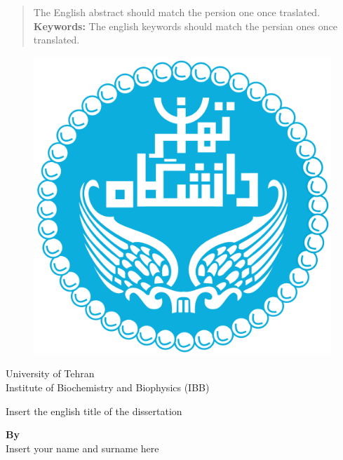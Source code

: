 \documentclass[12pt]{report}
\begin{document}
\begin{latin}
\begin{abstract}
The English abstract should match the persion one once traslated.\\[0.5cm]
\textbf{Keywords: } The english keywords should match the persian ones once translated. 
\end{abstract}
\newpage

\begin{figure}
\centering
\includegraphics[scale=0.1]{UT-Logo.png}
\end{figure}
\begin{center}
University of Tehran\\
Institute of Biochemistry and Biophysics (IBB)
\end{center}

\vfill

\begin{center}
\LARGE{Insert the english title of the dissertation}
\end{center}

\vfill

{\large \begin{center}
\textbf{
By\\
} Insert your name and surname here 
\end{center}

}
\end{latin}
\end{document}
